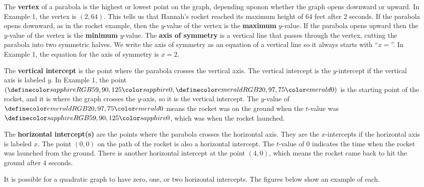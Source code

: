 \documentclass{ximera}
\begin{document}
 The \textbf{vertex}
      of a parabola is the highest or lowest point on the graph,
      depending uponon whether the graph opens downward or upward.
      In Example 1, the vertex is $(2,64)$.
      This tells us that Hannah's rocket reached its maximum height of $64$ feet after $2$ seconds.
      If the parabola opens downward, as in the rocket example,
      then the $y$-value of the vertex is the \textbf{maximum} $y$-value.
      If the parabola opens upward then the $y$-value of the vertex is the \textbf{minimum} $y$-value.
      The \textbf{axis of symmetry}
      is a vertical line that passes through the vertex, cutting the parabola into two symmetric halves.
      We write the axis of symmetry as an equation of a vertical line so it always starts with ``$x=$''.
      In Example 1, the equation for the axis of symmetry is $x=2$.
  

    
      The \textbf{vertical intercept} is the point where the parabola crosses the vertical axis.
      The vertical intercept is the $y$-intercept if the vertical axis is labeled $y$.
      In Example 1,
      the point $(\firsthighlight{0},\secondhighlight{0})$ is the starting point of the rocket,
      and it is where the graph crosses the $y$-axis,
      so it is the vertical intercept.
      The $y$-value of $\secondhighlight{0}$ means the rocket was on the ground
      when the $t$-value was $\firsthighlight{0}$, which was when the rocket launched.

      The \textbf{horizontal intercept(s)}
      are the points where the parabola crosses the horizontal axis.
      They are the $x$-intercepts if the horizontal axis is labeled $x$.
      The point $(0,0)$ on the path of the rocket is also a horizontal intercept.
      The $t$-value of $0$ indicates the time when the rocket was launched from the ground.
      There is another horizontal intercept at the point $(4,0)$,
      which means the rocket came back to hit the ground after $4$ seconds.
   
      It is possible for a quadratic graph to have zero, one, or two horizontal intercepts.
      The figures below show an example of each.
\end{document}

